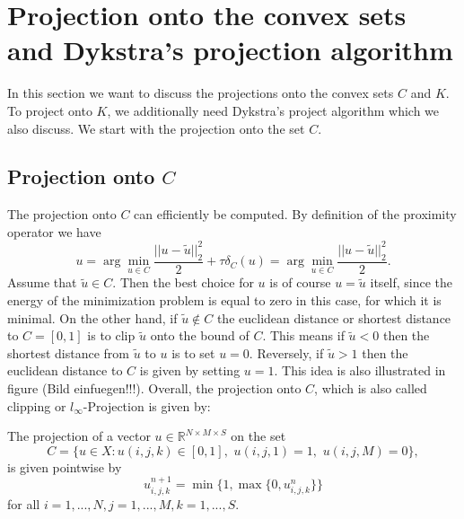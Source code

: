 \section{Projection onto the convex sets and Dykstra's projection algorithm}

    In this section we want to discuss the projections onto the convex sets $C$ and $K$. To project onto $K$, we additionally need Dykstra's project algorithm which we also discuss. We start with the projection onto the set $C$.

    \subsection{Projection onto $C$}

    The projection onto $C$ can efficiently be computed. By definition of the proximity operator we have
        $$
            u = \arg\min_{u \in C} \frac{||u-\tilde{u}||_{2}^{2}}{2} + \tau \delta_{C}(u) = \arg\min_{u \in C} \frac{||u - \tilde{u}||_{2}^{2}}{2}.
        $$
    Assume that $\tilde{u} \in C$. Then the best choice for $u$ is of course $u = \tilde{u}$ itself, since the energy of the minimization problem is equal to zero in this case, for which it is minimal. On the other hand, if $\tilde{u} \notin C$ the euclidean distance or shortest distance to $C = [0, 1]$ is to clip $\tilde{u}$ onto the bound of $C$. This means if $\tilde{u} < 0$ then the shortest distance from $\tilde{u}$ to $u$ is to set $u = 0$. Reversely, if $\tilde{u} > 1$ then the euclidean distance to $C$ is given by setting $u = 1$. This idea is also illustrated in figure (Bild einfuegen!!!). Overall, the projection onto $C$, which is also called clipping or $l_{\infty}$-Projection is given by:

    \begin{algorithm}[Clipping]
        The projection of a vector $u \in \mathbb{R}^{N \times M \times S}$ on the set
            \begin{equation}
                C = \{ u \in X: u(i,j,k) \in [0,1], \,\, u(i, j, 1) = 1, \,\, u(i, j, M) = 0 \}, \label{eq:limits}
            \end{equation}
        is given pointwise by
            \begin{equation}
                u^{n+1}_{i,j,k} = \min\{1, \max \{ 0, u^{n}_{i, j, k} \} \}
            \end{equation}
        for all $i = 1, ..., N, j = 1, ..., M, k = 1, ..., S$.
    \end{algorithm}

